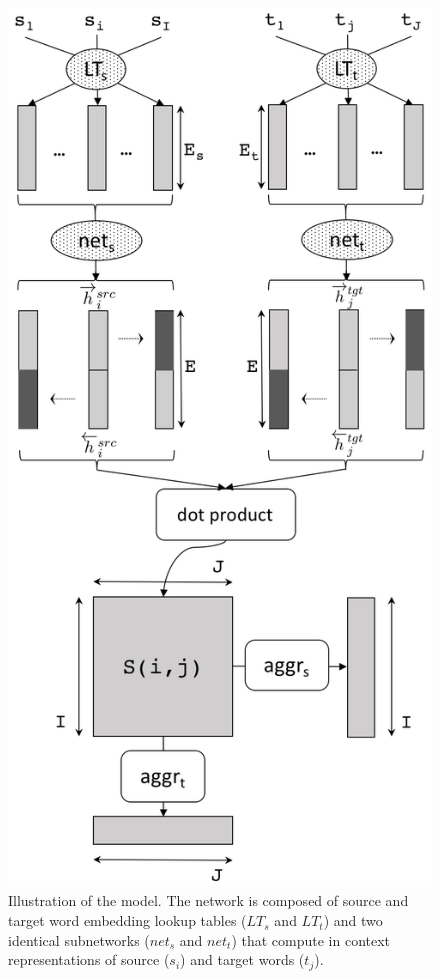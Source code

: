 \documentclass[11pt,a4paper]{article}
\begin{document}
\begin{figure}[h]
\center
    \includegraphics[width=1.0\linewidth]{network}
    \caption{Illustration of the model. The network is composed of source and target word embedding lookup tables ($LT_s$ and $LT_t$) and two identical subnetworks ($net_s$ and $net_t$) that compute in context representations of source ($s_i$) and target words ($t_j$).} 
    \label{network}
\end{figure}
\end{document}
